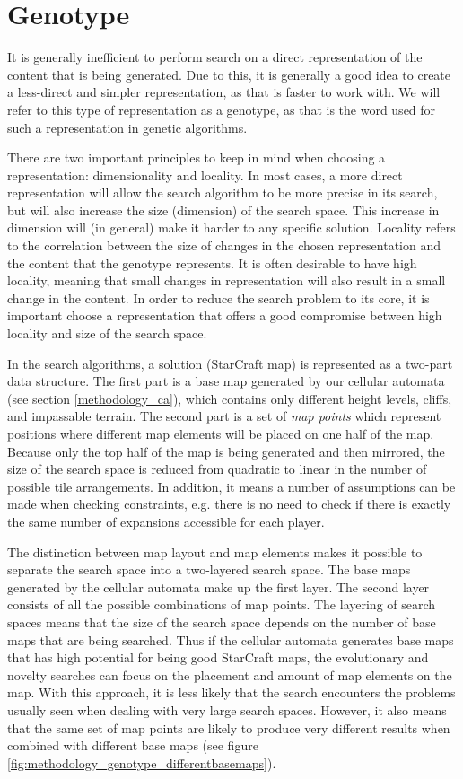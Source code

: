 \section{Genotype}
\label{methodology_genotype}
It is generally inefficient to perform search on a direct representation of the content that is being generated. Due to this, it is generally a good idea to create a less-direct and simpler representation, as that is faster to work with. We will refer to this type of representation as a genotype, as that is the word used for such a representation in genetic algorithms.

There are two important principles to keep in mind when choosing a representation: dimensionality and locality. In most cases, a more direct representation will allow the search algorithm to be more precise in its search, but will also increase the size (dimension) of the search space. This increase in dimension will (in general) make it harder to any specific solution. Locality refers to the correlation between the size of changes in the chosen representation and the content that the genotype represents. It is often desirable to have high locality, meaning that small changes in representation will also result in a small change in the content\cite{togelius2015searchbased}. In order to reduce the search problem to its core, it is important choose a representation that offers a good compromise between high locality and size of the search space. 

In the search algorithms, a solution (StarCraft map) is represented as a two-part data structure. The first part is a base map generated by our cellular automata (see section \ref{methodology_ca}), which contains only different height levels, cliffs, and impassable terrain. The second part is a set of \textit{map points} which represent positions where different map elements will be placed on one half of the map. Because only the top half of the map is being generated and then mirrored, the size of the search space is reduced from quadratic to linear in the number of possible tile arrangements. In addition, it means a number of assumptions can be made when checking constraints, e.g. there is no need to check if there is exactly the same number of expansions accessible for each player.

The distinction between map layout and map elements makes it possible to separate the search space into a two-layered search space. The base maps generated by the cellular automata make up the first layer. The second layer consists of all the possible combinations of map points. The layering of search spaces means that the size of the search space depends on the number of base maps that are being searched. Thus if the cellular automata generates base maps that has high potential for being good StarCraft maps, the evolutionary and novelty searches can focus on the placement and amount of map elements on the map. With this approach, it is less likely that the search encounters the problems usually seen when dealing with very large search spaces. However, it also means that the same set of map points are likely to produce very different results when combined with different base maps (see figure \ref{fig:methodology_genotype_differentbasemaps}).


